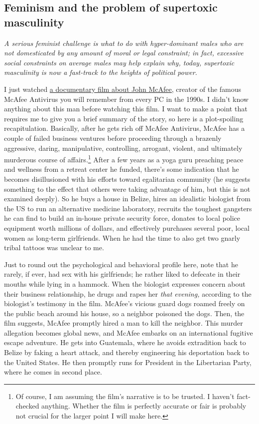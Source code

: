 \documentclass[a4paper,12pt,margin=.5in]{article}
\begin{document}
\subsection{Feminism and the problem of supertoxic
masculinity}\label{feminism-and-the-problem-of-supertoxic-masculinity}

\emph{A serious feminist challenge is what to do with hyper-dominant
males who are not domesticated by any amount of moral or legal
constraint; in fact, excessive social constraints on average males may
help explain why, today, supertoxic masculinity is now a fast-track to
the heights of political power.}

I just watched \href{http://www.imdb.com/title/tt6071534/}{a documentary
film about John McAfee,} creator of the famous McAfee Antivirus you will
remember from every PC in the 1990s. I didn't know anything about this
man before watching this film. I want to make a point that requires me
to give you a brief summary of the story, so here is a plot-spoiling
recapitulation. Basically, after he gets rich off McAfee Antivirus,
McAfee has a couple of failed business ventures before proceeding
through a brazenly aggressive, daring, manipulative, controlling,
arrogant, violent, and ultimately murderous course of affairs.\footnote{Of
  course, I am assuming the film's narrative is to be trusted. I haven't
  fact-checked anything. Whether the film is perfectly accurate or fair
  is probably not crucial for the larger point I will make here.} After
a few years as a yoga guru preaching peace and wellness from a retreat
center he funded, there's some indication that he becomes disillusioned
with his efforts toward egalitarian community (he suggests something to
the effect that others were taking advantage of him, but this is not
examined deeply). So he buys a house in Belize, hires an idealistic
biologist from the US to run an alternative medicine laboratory,
recruits the toughest gangsters he can find to build an in-house private
security force, donates to local police equipment worth millions of
dollars, and effectively purchases several poor, local women as
long-term girlfriends. When he had the time to also get two gnarly
tribal tattoos was unclear to me.

Just to round out the psychological and behavioral profile here, note
that he rarely, if ever, had sex with his girlfriends; he rather liked
to defecate in their mouths while lying in a hammock. When the biologist
expresses concern about their business relationship, he drugs and rapes
her \emph{that evening,} according to the biologist's testimony in the
film. McAfee's vicious guard dogs roamed freely on the public beach
around his house, so a neighbor poisoned the dogs. Then, the film
suggests, McAfee promptly hired a man to kill the neighbor. This murder
allegation becomes global news, and McAfee embarks on an international
fugitive escape adventure. He gets into Guatemala, where he avoids
extradition back to Belize by faking a heart attack, and thereby
engineering his deportation back to the United States. He then promptly
runs for President in the Libertarian Party, where he comes in second
place.
\end{document}
